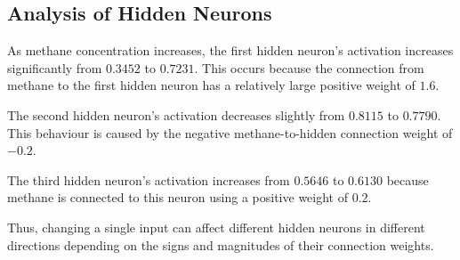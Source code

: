 \documentclass[12pt]{article}
\begin{document}
\begin{table}[H]
\centering
\small
\caption{Effect of methane concentration on network output}
\end{table}

\subsection{Analysis of Hidden Neurons}

As methane concentration increases, the first hidden neuron's
activation increases significantly from $0.3452$ to $0.7231$.
This occurs because the connection from methane to the first hidden
neuron has a relatively large positive weight of $1.6$.

The second hidden neuron's activation decreases slightly from
$0.8115$ to $0.7790$. This behaviour is caused by the negative
methane-to-hidden connection weight of $-0.2$.

The third hidden neuron's activation increases from $0.5646$ to
$0.6130$ because methane is connected to this neuron using a positive
weight of $0.2$.

Thus, changing a single input can affect different hidden neurons in
different directions depending on the signs and magnitudes of their
connection weights.
\end{document}
